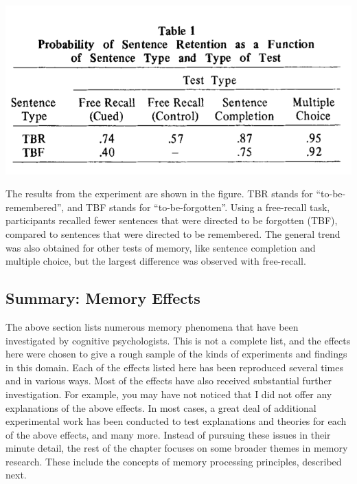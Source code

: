 \documentclass[
  oneside,
  12pt]{crumpbook}
\newenvironment{floatright50}{%
  \wrapfigure{R}{.5\textwidth}%
  }{%
  \endwrapfigure}
\begin{document}
\begin{floatright50}
\includegraphics[width=1\linewidth]{imgs/Direct_forgetting}

\end{floatright50}

The results from the experiment are shown in the figure. TBR stands for ``to-be-remembered'', and TBF stands for ``to-be-forgotten''. Using a free-recall task, participants recalled fewer sentences that were directed to be forgotten (TBF), compared to sentences that were directed to be remembered. The general trend was also obtained for other tests of memory, like sentence completion and multiple choice, but the largest difference was observed with free-recall.

\hypertarget{summary-memory-effects}{%
\subsection{Summary: Memory Effects}\label{summary-memory-effects}}

The above section lists numerous memory phenomena that have been investigated by cognitive psychologists. This is not a complete list, and the effects here were chosen to give a rough sample of the kinds of experiments and findings in this domain. Each of the effects listed here has been reproduced several times and in various ways. Most of the effects have also received substantial further investigation. For example, you may have not noticed that I did not offer any explanations of the above effects. In most cases, a great deal of additional experimental work has been conducted to test explanations and theories for each of the above effects, and many more. Instead of pursuing these issues in their minute detail, the rest of the chapter focuses on some broader themes in memory research. These include the concepts of memory processing principles, described next.
\end{document}
